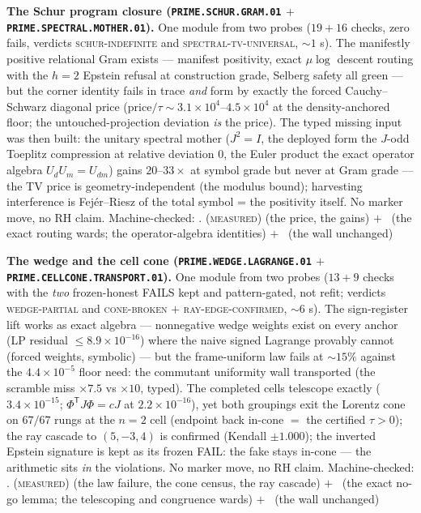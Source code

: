 \par\smallskip\noindent\textbf{The Schur program closure
(\texttt{PRIME.SCHUR.GRAM.01} $+$
\texttt{PRIME.SPECTRAL.MOTHER.01}).}
One module from two probes ($19 + 16$ checks, zero fails,
verdicts \textsc{schur-indefinite} and
\textsc{spectral-tv-universal}, ${\sim}1$ s).  The manifestly
positive relational Gram exists --- manifest positivity, exact
$\mu\log$ descent routing with the $h = 2$ Epstein refusal at
construction grade, Selberg safety all green --- but the corner
identity fails in trace \emph{and} form by exactly the forced
Cauchy--Schwarz diagonal price
(price$/\tau \sim 3.1\times10^4$--$4.5\times10^4$ at the
density-anchored floor; the untouched-projection deviation
\emph{is} the price).  The typed missing input was then built:
the unitary spectral mother ($J^2 = I$, the deployed form the
$J$-odd Toeplitz compression at relative deviation $0$, the
Euler product the exact operator algebra $U_dU_m = U_{dm}$)
gains $20$--$33\times$ at symbol grade but never at Gram grade
--- the TV price is geometry-independent (the modulus bound);
harvesting interference is Fej\'er--Riesz of the total symbol =
the positivity itself.  No marker move, no RH claim.
Machine-checked: .
(\textsc{measured}) (the price, the gains) $+$ \mE\ (the exact
routing wards; the operator-algebra identities) $+$ \mO\ (the
wall unchanged)
\par\smallskip


\par\smallskip\noindent\textbf{The wedge and the cell cone
(\texttt{PRIME.WEDGE.LAGRANGE.01} $+$
\texttt{PRIME.CELLCONE.TRANSPORT.01}).}
One module from two probes ($13 + 9$ checks with the \emph{two}
frozen-honest FAILS kept and pattern-gated, not refit; verdicts
\textsc{wedge-partial} and \textsc{cone-broken} $+$
\textsc{ray-edge-confirmed}, ${\sim}6$ s).  The sign-register
lift works as exact algebra --- nonnegative wedge weights exist
on every anchor (LP residual $\le 8.9\times10^{-16}$) where the
naive signed Lagrange provably cannot (forced weights,
symbolic) --- but the frame-uniform law fails at ${\sim}15\%$
against the $4.4\times10^{-5}$ floor need: the commutant
uniformity wall transported (the scramble miss $\times7.5$ vs
$\times10$, typed).  The completed cells telescope exactly
($3.4\times10^{-15}$; $\Phi^{\mathsf T}J\Phi = cJ$ at
$2.2\times10^{-16}$), yet both groupings exit the Lorentz cone
on $67/67$ rungs at the $n = 2$ cell (endpoint back in-cone $=$
the certified $\tau > 0$); the ray cascade to $(5,-3,4)$ is
confirmed (Kendall $\pm1.000$); the inverted Epstein signature
is kept as its frozen FAIL: the fake stays in-cone --- the
arithmetic sits \emph{in} the violations.  No marker move, no RH
claim.
Machine-checked: .
(\textsc{measured}) (the law failure, the cone census, the ray
cascade) $+$ \mE\ (the exact no-go lemma; the telescoping and
congruence wards) $+$ \mO\ (the wall unchanged)
\par\smallskip


